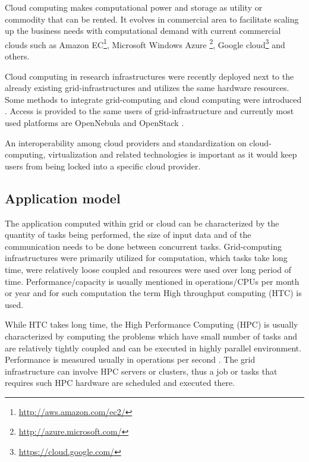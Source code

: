 Cloud computing makes computational power and storage as utility or commodity that can be rented. It evolves in commercial area to facilitate scaling up the business needs with computational demand with current commercial clouds such as Amazon EC\footnote{\url{http://aws.amazon.com/ec2/}}, Microsoft Windows Azure \footnote{\url{http://azure.microsoft.com/}}, Google cloud\footnote{\url{https://cloud.google.com/}} and others.

Cloud computing in research infrastructures were recently deployed next to the already existing grid-infrastructures and utilizes the same hardware resources. Some methods to integrate grid-computing and cloud computing were introduced \cite{Anjum2012}. Access is provided to the same users of grid-infrastructure and currently most used platforms are Open\-Nebula  \cite{Milojicic2011} and OpenStack  \cite{Kumar2014}.

An interoperability among cloud providers and standardization on cloud-computing, virtualization and related technologies is important as it would keep users from being locked into a specific cloud provider\cite{Ortiz2011}.

\subsection{Application model}

The application computed within grid or cloud can be characterized by the quantity of tasks being performed, the size of input data and of the communication needs to be done between concurrent tasks. 
Grid-computing infrastructures were primarily utilized for computation, which tasks take long time, were relatively loose coupled and resources were used over long period of time. Performance/capacity is usually mentioned  in operations/CPUs per month or year and for such computation the term High throughput computing (HTC) is used.

While HTC takes long time, the High Performance Computing (HPC) is usually characterized by computing the problems which have small number of tasks and are relatively tightly coupled and can be executed in highly parallel environment. Performance is measured usually in operations per second  \cite{Hager2010,Levesque2010}. The grid infrastructure can involve HPC servers or clusters, thus a job or tasks that requires such HPC hardware are scheduled and executed there.

